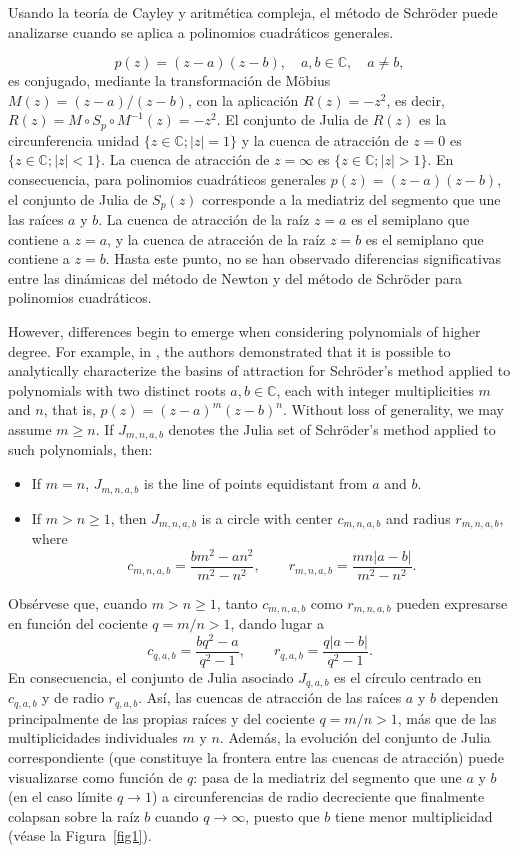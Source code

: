 \IfFileExists{aims.cls}{\documentclass{aims}}{\documentclass[11pt]{article}}
\numberwithin{equation}{section}
\theoremstyle{thmstyleone}%
\theoremstyle{thmstyletwo}%
\theoremstyle{thmstylethree}%
\begin{document}
Usando la teoría de Cayley y aritmética compleja, el método de Schröder puede analizarse cuando se aplica a polinomios cuadráticos generales.

$$
p(z)=(z-a)(z-b), \quad a, b \in \mathbb{C}, \quad a\ne b,
$$
es conjugado, mediante la transformación de M\"obius $M(z)=(z-a)/(z-b)$, con la aplicación $R(z)=-z^2$, es decir,
$
R(z)=M\circ S_p \circ M^{-1}(z)=-z^2.
$
El conjunto de Julia de $R(z)$ es la circunferencia unidad $\{ z\in\mathbb{C}; \vert z \vert=1\}$ y la cuenca de atracción de $z=0$ es $\{ z\in\mathbb{C}; \vert z \vert<1\}$. La cuenca de atracción de $z=\infty$ es $\{ z\in\mathbb{C}; \vert z \vert>1\}$. En consecuencia, para polinomios cuadráticos generales $p(z)=(z-a)(z-b)$, el conjunto de Julia de $S_p(z)$ corresponde a la mediatriz del segmento que une las raíces $a$ y $b$. La cuenca de atracción de la raíz $z=a$ es el semiplano que contiene a $z=a$, y la cuenca de atracción de la raíz $z=b$ es el semiplano que contiene a $z=b$. Hasta este punto, no se han observado diferencias significativas entre las dinámicas del método de Newton y del método de Schröder para polinomios cuadráticos.

However, differences begin to emerge when considering polynomials of higher degree. For example, in \cite{5GV}, the authors demonstrated that it is possible to analytically characterize the basins of attraction for Schröder's method applied to polynomials with two distinct roots $a,b \in \mathbb{C}$, each with integer multiplicities $m$ and $n$, that is, $p(z)=(z-a)^m(z-b)^n$. Without loss of generality, we may assume $m\ge n$. If $J_{m,n,a,b}$ denotes the Julia set of Schröder's method applied to such polynomials, then:
\begin{itemize}
\item If $m = n$, $J_{m,n,a,b}$ is the line of points equidistant from $a$ and $b$.
\item  If $m > n \ge 1$, then $J_{m,n,a,b}$ is a circle with center $c_{m,n,a,b}$ and radius $r_{m,n,a,b}$, where
$$ 
c_{m,n,a,b}=\frac{bm^2 - an^2}{m^2-n^2}, \qquad
r_{m,n,a,b}= \frac{mn \vert a-b\vert}{m^2-n^2}.
$$
\end{itemize}

Obsérvese que, cuando $m > n \ge 1$, tanto $c_{m,n,a,b}$ como $r_{m,n,a,b}$ pueden expresarse en función del cociente $q=m/n>1$, dando lugar a
$$ 
c_{q,a,b}=\frac{bq^2 - a}{q^2-1}, \qquad
r_{q,a,b}= \frac{q \vert a-b\vert}{q^2-1}.
$$
En consecuencia, el conjunto de Julia asociado $J_{q,a,b}$ es el círculo centrado en $c_{q,a,b}$ y de radio $r_{q,a,b}$. Así, las cuencas de atracción de las raíces $a$ y $b$ dependen principalmente de las propias raíces y del cociente $q=m/n>1$, más que de las multiplicidades individuales $m$ y $n$. Además, la evolución del conjunto de Julia correspondiente (que constituye la frontera entre las cuencas de atracción) puede visualizarse como función de $q$: pasa de la mediatriz del segmento que une $a$ y $b$ (en el caso límite $q\to 1$) a circunferencias de radio decreciente que finalmente colapsan sobre la raíz $b$ cuando $q\to \infty$, puesto que $b$ tiene menor multiplicidad (véase la Figura~\ref{fig1}).
\end{document}
